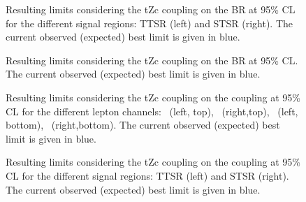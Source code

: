 \begin{figure}[ht]
	\centering
	\caption{Resulting limits considering the tZc coupling on the BR at 95\%  CL for the different signal regions: TTSR (left) and STSR (right). The current observed (expected) best limit is given in blue.}
	\label{fig:exclusionlimitbrfcnczctttst}
\end{figure}


\begin{figure}[ht]
	\centering
	\caption{Resulting limits considering the tZc coupling on the BR at 95\%  CL. The current observed (expected) best limit is given in blue.}
	\label{fig:exclusionlimitbrfcnczct}
\end{figure}

\begin{figure}[ht]
	\centering
	\caption{Resulting limits considering the tZc coupling on the coupling at 95\%  CL for the different lepton channels: \mumumu\ (left, top), \emumu\ (right,top), \eee\ (left, bottom), \eemu\ (right,bottom). The current observed (expected) best limit is given in blue.}
	\label{fig:exclusionlimitbrfcnczctchannelsc}
\end{figure}

\begin{figure}[ht]
	\centering
	\caption{Resulting limits considering the tZc coupling on the coupling at 95\%  CL for the different signal regions: TTSR (left) and STSR (right). The current observed (expected) best limit is given in blue.}
	\label{fig:exclusionlimitbrfcnczctttstc}
\end{figure}


